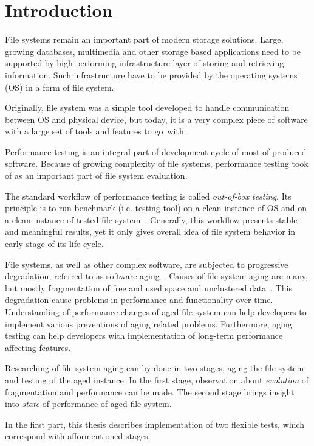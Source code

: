 \documentclass[
  color, %
  table, %
  lof,   %
  lot,   %
]{fithesis3}
\begin{document}
\chapter{Introduction}
File systems remain an important part of modern storage solutions. Large, growing databases, multimedia and other storage based applications need to be supported by high-performing infrastructure layer of storing and retrieving information. Such infrastructure have to be provided by the operating systems (OS) in a form of file system.

Originally, file system was a simple tool developed to handle communication between OS and physical device, but today, it is a very complex piece of software with a large set of tools and features to go~with.

Performance testing is an integral part of development cycle of most of produced software. Because of growing complexity of file systems, performance testing took of as an important part of file system evaluation.

The standard workflow of performance testing is called \emph{out-of-box testing}. Its principle is to run benchmark (i.e. testing tool) on a clean instance of OS and on a clean instance of tested file system~\cite{Traeger:2008:NYS:1367829.1367831}. Generally, this workflow presents stable and meaningful results, yet it only gives overall idea of file system behavior in early stage of its life cycle. 

File systems, as well as other complex software, are subjected to progressive degradation, referred to as software aging~\cite{Cotroneo:2014:SSA:2543749.2539117}. Causes of file system aging are many, but mostly fragmentation of free and used space and unclustered data~\cite{Smith:1997:FSA:258623.258689}. This degradation cause problems in performance and functionality over time. Understanding of performance changes of aged file system can help developers to implement various preventions of aging related problems. Furthermore, aging testing can help developers with implementation of long-term performance affecting features.

Researching of file system aging can by done in two stages, aging the file system and testing of the aged instance. In the first stage, observation about \emph{evolution} of fragmentation and performance can be made. The second stage brings insight into \emph{state} of performance of aged file system.

In the first part, this thesis describes implementation of two flexible tests, which correspond with afformentioned stages.
 
\end{document}
